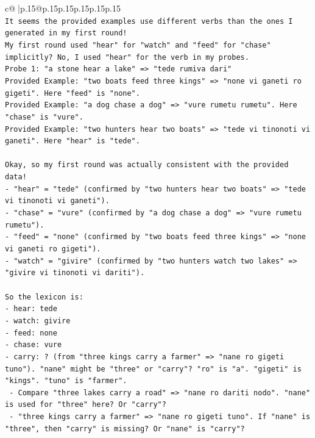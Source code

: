 \documentclass{article}
\begin{document}
{\begin{supertabular}{c@{$\;$}|p{.15\linewidth}@{}p{.15\linewidth}p{.15\linewidth}p{.15\linewidth}p{.15\linewidth}p{.15\linewidth}}
{{{\\ 
\texttt{It seems the provided examples use different verbs than the ones I generated in my first round!} \\
\texttt{My first round used "hear" for "watch" and "feed" for "chase" implicitly? No, I used "hear" for the verb in my probes.} \\
\texttt{Probe 1: "a stone hear a lake" => "tede rumiva dari"} \\
\texttt{Provided Example: "two boats feed three kings" => "none vi ganeti ro gigeti". Here "feed" is "none".} \\
\texttt{Provided Example: "a dog chase a dog" => "vure rumetu rumetu". Here "chase" is "vure".} \\
\texttt{Provided Example: "two hunters hear two boats" => "tede vi tinonoti vi ganeti". Here "hear" is "tede".} \\
\\ 
\texttt{Okay, so my first round was actually consistent with the provided data!} \\
\texttt{{-} "hear" = "tede" (confirmed by "two hunters hear two boats" => "tede vi tinonoti vi ganeti").} \\
\texttt{{-} "chase" = "vure" (confirmed by "a dog chase a dog" => "vure rumetu rumetu").} \\
\texttt{{-} "feed" = "none" (confirmed by "two boats feed three kings" => "none vi ganeti ro gigeti").} \\
\texttt{{-} "watch" = "givire" (confirmed by "two hunters watch two lakes" => "givire vi tinonoti vi dariti").} \\
\\ 
\texttt{So the lexicon is:} \\
\texttt{{-} hear: tede} \\
\texttt{{-} watch: givire} \\
\texttt{{-} feed: none} \\
\texttt{{-} chase: vure} \\
\texttt{{-} carry: ? (from "three kings carry a farmer" => "nane ro gigeti tuno"). "nane" might be "three" or "carry"? "ro" is "a". "gigeti" is "kings". "tuno" is "farmer".} \\
\texttt{  {-} Compare "three lakes carry a road" => "nane ro dariti nodo". "nane" is used for "three" here? Or "carry"?} \\
\texttt{  {-} "three kings carry a farmer" => "nane ro gigeti tuno". If "nane" is "three", then "carry" is missing? Or "nane" is "carry"?} \\
}}}
\end{supertabular}}
\end{document}
